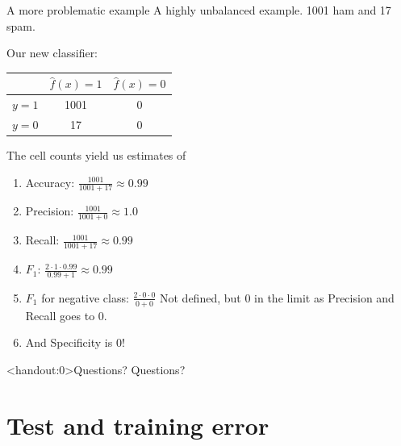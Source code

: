 \documentclass[10pt]{beamer}
\begin{document}
\begin{frame}{A more problematic example}
A highly unbalanced example. 1001 ham and 17 spam.

Our new classifier: \pause

\begin{center}
\begin{tabular}{ l | c | c }
  & $\hat{f}(x)=1$ & $\hat{f}(x)=0$\\
  \hline
  $y=1$ & 1001 & 0 \\
  $y=0$ & 17 & 0 \\
  \hline
\end{tabular}
\end{center}
\pause
The cell counts yield us estimates of
\begin{enumerate}
\item Accuracy: $\frac{1001}{1001+17}\approx 0.99$
\item Precision: $\frac{1001}{1001+0}\approx 1.0$
\item Recall: $\frac{1001}{1001+17}\approx 0.99$
\item $F_1$: $\frac{2 \cdot 1 \cdot 0.99}{0.99 + 1}\approx 0.99$
\pause
\item $F_1$ for negative class: $\frac{2 \cdot 0 \cdot 0}{0 + 0}$ Not defined, but 0 in the limit as Precision and Recall goes to 0.
\item And Specificity is 0!
\end{enumerate}

\end{frame}




\begin{frame}<handout:0>{Questions?}
Questions?
\end{frame}



\section{Test and training error}
\frame{\sectionpage}
\end{document}
